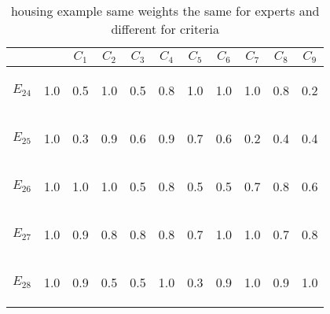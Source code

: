 \begin{table}[htp]
\begin{center}
\begin{tabular}{|cc|c|c|c|c|c|c|c|c|c|}
\hline \hline
& & $C_1$ & $C_2$ & $C_3$ & $C_4$ & $C_5$ & $C_6$ & $C_7$ & $C_8$ & $C_9$\\
\hline \hline
\begin{scriptsize}$E_{24}$\end{scriptsize} & \begin{scriptsize}1.0\end{scriptsize} & 0.5 & 1.0 & 0.5 & 0.8 & 1.0 & 1.0 & 1.0 & 0.8 & 0.2\\
\begin{scriptsize}$E_{25}$\end{scriptsize} & \begin{scriptsize}1.0\end{scriptsize} & 0.3 & 0.9 & 0.6 & 0.9 & 0.7 & 0.6 & 0.2 & 0.4 & 0.4\\
\begin{scriptsize}$E_{26}$\end{scriptsize} & \begin{scriptsize}1.0\end{scriptsize} & 1.0 & 1.0 & 0.5 & 0.8 & 0.5 & 0.5 & 0.7 & 0.8 & 0.6\\
\begin{scriptsize}$E_{27}$\end{scriptsize} & \begin{scriptsize}1.0\end{scriptsize} & 0.9 & 0.8 & 0.8 & 0.8 & 0.7 & 1.0 & 1.0 & 0.7 & 0.8\\
\begin{scriptsize}$E_{28}$\end{scriptsize} & \begin{scriptsize}1.0\end{scriptsize} & 0.9 & 0.5 & 0.5 & 1.0 & 0.3 & 0.9 & 1.0 & 0.9 & 1.0\\
\hline \hline
\end{tabular}
\end{center}
\caption{housing example same weights the same for experts and different for criteria}
\label{expertSame}
\end{table}